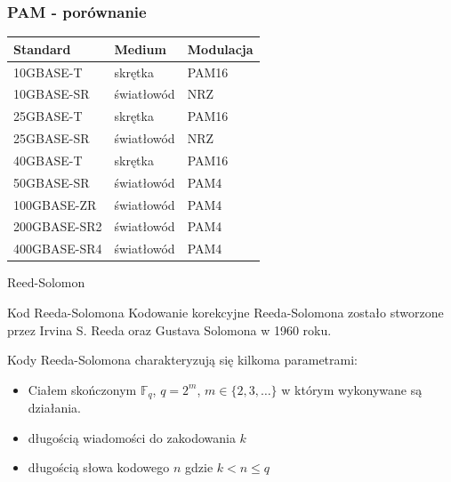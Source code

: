 \documentclass{beamer}
\begin{document}
\begin{frame}
\frametitle{PAM - porównanie}
\begin{table}[h]
\centering
    \begin{tabular}{m{3cm} m{3cm} m{3cm}}
    \toprule
    Standard & Medium & Modulacja \\
    \midrule
    10GBASE-T & skrętka & PAM16 \\
    \midrule
    10GBASE-SR & światłowód & NRZ \\
    \midrule
    25GBASE-T & skrętka & PAM16 \\
    \midrule
    25GBASE-SR & światłowód & NRZ \\
    \midrule
    40GBASE-T & skrętka & PAM16 \\
    \midrule
    50GBASE-SR & światłowód & PAM4 \\
    \midrule
    100GBASE-ZR & światłowód & PAM4 \\
    \midrule
    200GBASE-SR2 & światłowód & PAM4 \\
    \midrule
    400GBASE-SR4 & światłowód & PAM4 \\
    \bottomrule
    \end{tabular}
\end{table}
\end{frame}


\begin{frame}{Reed-Solomon}
	\begin{exampleblock}{Kod Reeda-Solomona}
		Kodowanie korekcyjne Reeda-Solomona zostało stworzone przez Irvina S. Reeda	oraz Gustava Solomona w 1960 roku.

		Kody Reeda-Solomona charakteryzują się kilkoma parametrami:

		\begin{itemize}
			\item Ciałem skończonym $\mathbb{F}_{q}$,  $q=2^m$, $m \in \{ 2, 3, \ldots \}$ w którym wykonywane są działania.
			\item długością wiadomości do zakodowania $k$
			\item długością słowa kodowego $n$ gdzie $k < n \leq q$
		\end{itemize}
	\end{exampleblock}
\end{frame}
\end{document}
